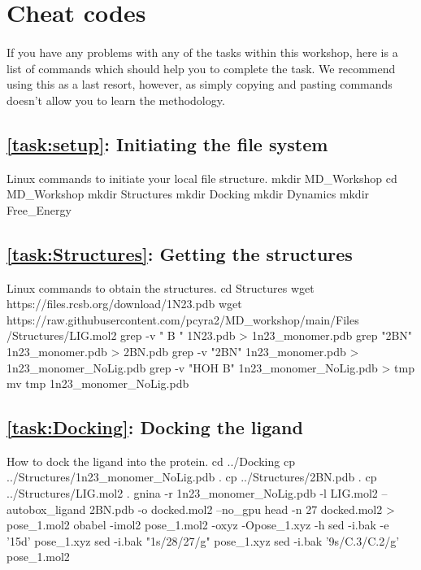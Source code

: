 \newpage
\section{Cheat codes}\label{sec:Cheats}
    \paragraph{}
    If you have any problems with any of the tasks within this workshop, here is a list of commands which should help you to complete the task. We recommend using this as a last resort, however,
    as simply copying and pasting commands doesn't allow you to learn the methodology. 

    \subsection{\cref{task:setup}: Initiating the file system}
    \begin{bashcmd}[label=cmd:task1]{Linux commands to initiate your local file structure.}
    mkdir MD_Workshop
    cd MD_Workshop
    mkdir Structures
    mkdir Docking
    mkdir Dynamics
    mkdir Free_Energy
    \end{bashcmd}
    
    \subsection{\cref{task:Structures}: Getting the structures}
    \begin{bashcmd}[label=cmd:task2]{Linux commands to obtain the structures.}
    cd Structures
    wget https://files.rcsb.org/download/1N23.pdb
    wget https://raw.githubusercontent.com/pcyra2/MD_workshop/main/Files /Structures/LIG.mol2
    grep -v " B " 1N23.pdb > 1n23_monomer.pdb
    grep "2BN" 1n23_monomer.pdb > 2BN.pdb
    grep -v "2BN" 1n23_monomer.pdb > 1n23_monomer_NoLig.pdb  
    grep -v "HOH B" 1n23_monomer_NoLig.pdb > tmp
    mv tmp 1n23_monomer_NoLig.pdb
    \end{bashcmd}

    \subsection{\cref{task:Docking}: Docking the ligand}
    \begin{bashcmd}[label=cmd:task3]{How to dock the ligand into the protein.}
    cd ../Docking
    cp ../Structures/1n23_monomer_NoLig.pdb .
    cp ../Structures/2BN.pdb .
    cp ../Structures/LIG.mol2 .
    gnina -r 1n23_monomer_NoLig.pdb -l LIG.mol2 --autobox_ligand 2BN.pdb -o docked.mol2 --no_gpu
    head -n 27 docked.mol2 > pose_1.mol2
    obabel -imol2 pose_1.mol2 -oxyz -Opose_1.xyz -h
    sed -i.bak -e '15d' pose_1.xyz 
    sed -i.bak "1s/28/27/g" pose_1.xyz
    sed -i.bak '9s/C.3/C.2/g' pose_1.mol2
    \end{bashcmd}

